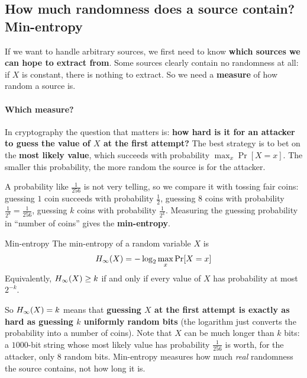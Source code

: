 \subsection{How much randomness does a source contain? Min-entropy}

If we want to handle arbitrary sources, we first need to know \textbf{which sources we can hope to extract from}. Some sources clearly contain no randomness at all: if $X$ is constant, there is nothing to extract. So we need a \textbf{measure} of how random a source is.

\paragraph{Which measure?} In cryptography the question that matters is: \textbf{how hard is it for an attacker to guess the value of $X$ at the first attempt?} The best strategy is to bet on the \textbf{most likely value}, which succeeds with probability $\max_x \Pr[X = x]$. The smaller this probability, the more random the source is for the attacker.

A probability like $\frac{1}{256}$ is not very telling, so we compare it with tossing fair coins: guessing $1$ coin succeeds with probability $\frac{1}{2}$, guessing $8$ coins with probability $\frac{1}{2^8} = \frac{1}{256}$, guessing $k$ coins with probability $\frac{1}{2^k}$. Measuring the guessing probability in ``number of coins'' gives the \textbf{min-entropy}.

\begin{frameddefn}[label={def:min-entropy}]{Min-entropy}
  The min-entropy of a random variable $X$ is
  \[
    H_\infty(X) = -\log_2 \max_x \Pr[X = x]
  \]
  Equivalently, $H_\infty(X) \geq k$ if and only if every value of $X$ has probability at most $2^{-k}$.
\end{frameddefn}

So $H_\infty(X) = k$ means that \textbf{guessing $X$ at the first attempt is exactly as hard as guessing $k$ uniformly random bits} (the logarithm just converts the probability into a number of coins). Note that $X$ can be much longer than $k$ bits: a $1000$-bit string whose most likely value has probability $\frac{1}{256}$ is worth, for the attacker, only $8$ random bits. Min-entropy measures how much \textit{real} randomness the source contains, not how long it is.

